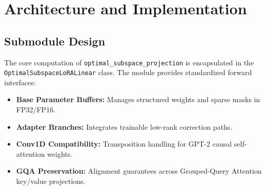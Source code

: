 \section{Architecture and Implementation}

\subsection{Submodule Design}
The core computation of \texttt{optimal_subspace_projection} is encapsulated in the \texttt{OptimalSubspaceLoRALinear} class. The module provides standardized forward interfaces:
\begin{itemize}
\item \textbf{Base Parameter Buffers:} Manages structured weights and sparse masks in FP32/FP16.
\item \textbf{Adapter Branches:} Integrates trainable low-rank correction paths.
\item \textbf{Conv1D Compatibility:} Transposition handling for GPT-2 causal self-attention weights.
\item \textbf{GQA Preservation:} Alignment guarantees across Grouped-Query Attention key/value projections.
\end{itemize}
